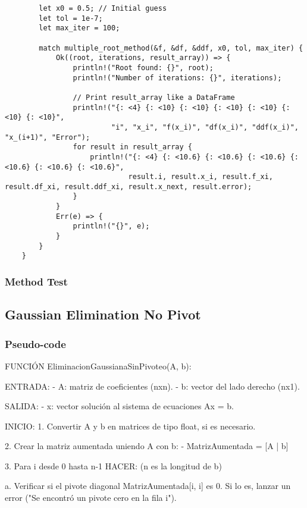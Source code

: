 \documentclass{article}
\begin{document}
\begin{verbatim}
        let x0 = 0.5; // Initial guess
        let tol = 1e-7;
        let max_iter = 100;

        match multiple_root_method(&f, &df, &ddf, x0, tol, max_iter) {
            Ok((root, iterations, result_array)) => {
                println!("Root found: {}", root);
                println!("Number of iterations: {}", iterations);

                // Print result_array like a DataFrame
                println!("{: <4} {: <10} {: <10} {: <10} {: <10} {: <10} {: <10}",
                         "i", "x_i", "f(x_i)", "df(x_i)", "ddf(x_i)", "x_(i+1)", "Error");
                for result in result_array {
                    println!("{: <4} {: <10.6} {: <10.6} {: <10.6} {: <10.6} {: <10.6} {: <10.6}",
                             result.i, result.x_i, result.f_xi, result.df_xi, result.ddf_xi, result.x_next, result.error);
                }
            }
            Err(e) => {
                println!("{}", e);
            }
        }
    }
                \end{verbatim}
        \subsubsection{Method Test}

    \subsection{Gaussian Elimination No Pivot}
        \subsubsection{Pseudo-code}
        FUNCIÓN EliminacionGaussianaSinPivoteo(A, b):

    ENTRADA:
    - A: matriz de coeficientes (nxn).
    - b: vector del lado derecho (nx1).

    SALIDA:
    - x: vector solución al sistema de ecuaciones Ax = b.

    INICIO:
    1. Convertir A y b en matrices de tipo float, si es necesario.

    2. Crear la matriz aumentada uniendo A con b:
       - MatrizAumentada = [A | b]

    3. Para i desde 0 hasta n-1 HACER:  (n es la longitud de b)

        a. Verificar si el pivote diagonal MatrizAumentada[i, i] es 0. Si lo es, lanzar un error ("Se encontró un pivote cero en la fila i").
\end{document}

